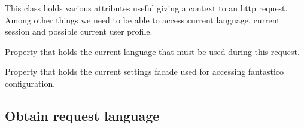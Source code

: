 \documentclass[letterpaper,10pt,english]{sphinxmanual}
\begin{document}
\begin{fulllineitems}
\label{features/request_response:fantastico.middleware.request_context.RequestContext}
This class holds various attributes useful giving a context to an http request. Among other things we need 
to be able to access current language, current session and possible current user profile.

\begin{fulllineitems}
\label{features/request_response:fantastico.middleware.request_context.RequestContext.language}
Property that holds the current language that must be used during this request.

\end{fulllineitems}


\begin{fulllineitems}
\label{features/request_response:fantastico.middleware.request_context.RequestContext.settings}
Property that holds the current settings facade used for accessing fantastico configuration.

\end{fulllineitems}


\end{fulllineitems}



\subsection{Obtain request language}
\label{features/request_response:obtain-request-language}
\end{document}
